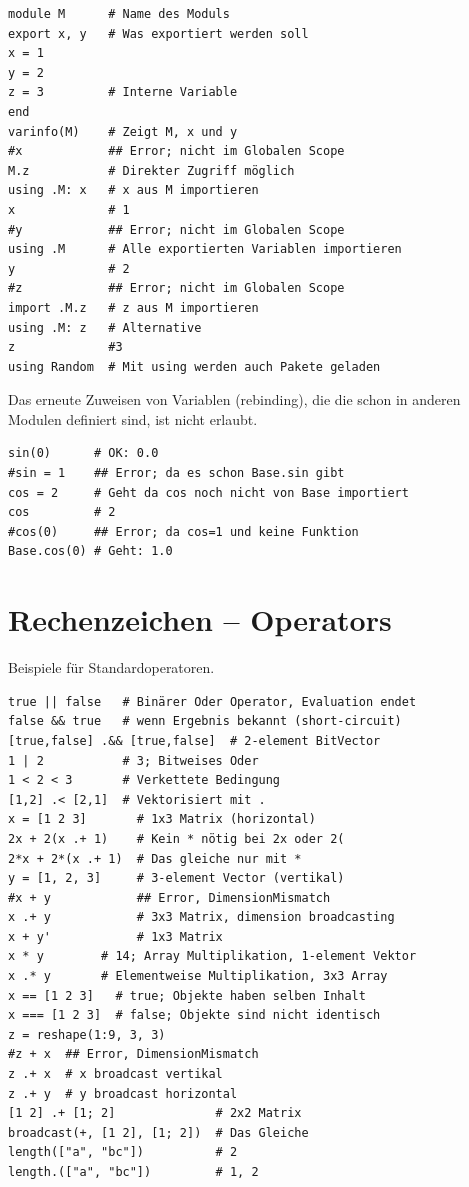 \documentclass[10pt,twocolumn]{scrartcl}
\begin{document}
\begin{lstlisting}
module M      # Name des Moduls
export x, y   # Was exportiert werden soll
x = 1
y = 2
z = 3         # Interne Variable
end
varinfo(M)    # Zeigt M, x und y
#x            ## Error; nicht im Globalen Scope
M.z           # Direkter Zugriff möglich
using .M: x   # x aus M importieren
x             # 1
#y            ## Error; nicht im Globalen Scope
using .M      # Alle exportierten Variablen importieren
y             # 2
#z            ## Error; nicht im Globalen Scope
import .M.z   # z aus M importieren
using .M: z   # Alternative
z             #3
using Random  # Mit using werden auch Pakete geladen
\end{lstlisting}


Das erneute Zuweisen von Variablen (rebinding), die die schon in anderen Modulen
definiert sind, ist nicht erlaubt.

\begin{lstlisting}
sin(0)      # OK: 0.0
#sin = 1    ## Error; da es schon Base.sin gibt
cos = 2     # Geht da cos noch nicht von Base importiert
cos         # 2
#cos(0)     ## Error; da cos=1 und keine Funktion
Base.cos(0) # Geht: 1.0
\end{lstlisting}

\section{Rechenzeichen -- Operators}
\label{sec:operatoren}

Beispiele für Standardoperatoren.

\begin{lstlisting}
true || false   # Binärer Oder Operator, Evaluation endet
false && true   # wenn Ergebnis bekannt (short-circuit)
[true,false] .&& [true,false]  # 2-element BitVector
1 | 2           # 3; Bitweises Oder
1 < 2 < 3       # Verkettete Bedingung
[1,2] .< [2,1]  # Vektorisiert mit .
x = [1 2 3]       # 1x3 Matrix (horizontal)
2x + 2(x .+ 1)    # Kein * nötig bei 2x oder 2(
2*x + 2*(x .+ 1)  # Das gleiche nur mit *
y = [1, 2, 3]     # 3-element Vector (vertikal)
#x + y            ## Error, DimensionMismatch
x .+ y            # 3x3 Matrix, dimension broadcasting
x + y'            # 1x3 Matrix
x * y        # 14; Array Multiplikation, 1-element Vektor
x .* y       # Elementweise Multiplikation, 3x3 Array
x == [1 2 3]   # true; Objekte haben selben Inhalt
x === [1 2 3]  # false; Objekte sind nicht identisch
z = reshape(1:9, 3, 3)
#z + x  ## Error, DimensionMismatch
z .+ x  # x broadcast vertikal
z .+ y  # y broadcast horizontal
[1 2] .+ [1; 2]              # 2x2 Matrix
broadcast(+, [1 2], [1; 2])  # Das Gleiche
length(["a", "bc"])          # 2
length.(["a", "bc"])         # 1, 2
\end{lstlisting}
\end{document}
